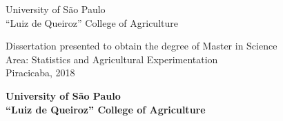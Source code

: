 \vspace{1.7cm}
\hspace{5.9cm}
\begin{minipage}{13cm}
  \raggedright
  \arialfont

  {\fontsize{20}{20}\selectfont\color{gray}
    University of São Paulo}\\[0.1cm]
  {\fontsize{16}{16}\selectfont\color{gray}
    ``Luiz de Queiroz'' College of Agriculture}\\
  \vspace{2.9cm}

  {\fontsize{22}{22}\selectfont \TituloDoTrabalho}
  \vspace{2.8cm}

  {\fontsize{20}{20}\selectfont \Autor}
  \vspace{13.8cm}

  Dissertation presented to obtain the degree of Master in Science\\[-.1cm]
  Area: Statistics and Agricultural Experimentation\\[-.1cm]
  Piracicaba, 2018
\end{minipage}
\restoregeometry

\newpage
\thispagestyle{empty}
\phantom{ôlas}

\cleardoublepage
\thispagestyle{empty}

\begin{center}
  { \fontsize{14}{14} \sffamily \bfseries
    University of S\~{a}o Paulo\\
    ``Luiz de Queiroz'' College of Agriculture\\
    \CENA
  }
\end{center}

\vfill %

